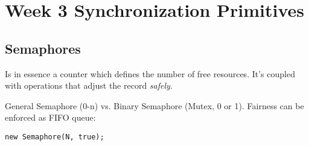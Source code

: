 \section{Week 3 Synchronization Primitives}

\subsection{Semaphores}

Is in essence a counter which defines the number of free resources. It's coupled with operations that adjust the record \emph{safely}.

General Semaphore (0-n) vs. Binary Semaphore (Mutex, 0 or 1). Fairness can be enforced as FIFO queue:

\verb|new Semaphore(N, true);|

